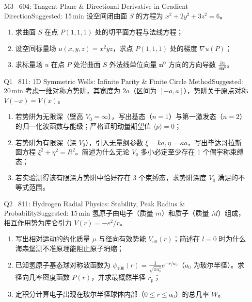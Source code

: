 \documentclass[a4paper,11pt]{article}
\begin{document}
\vspace{3pt}

\begin{problem}{M3 \textbar\ 604: Tangent Plane \& Directional Derivative in Gradient Direction}{Suggested: 15\,min}
设空间闭曲面 $S$ 的方程为 $x^2 + 2y^2 + 3z^2 = 6$。
\begin{enumerate}[leftmargin=1.5em,itemsep=1pt,topsep=1pt]
  \item 求曲面 $S$ 在点 $P(1, 1, 1)$ 处的切平面方程与法线方程；
  \item 设空间标量场 $u(x, y, z) = x^2 y z$，求点 $P(1, 1, 1)$ 处的梯度 $\nabla u(P)$；
  \item 求标量场 $u$ 在点 $P$ 处沿曲面 $S$ 外法线单位向量 $\mathbf{n}^0$ 方向的方向导数 $\frac{\partial u}{\partial \mathbf{n}^0}$。
\end{enumerate}
\end{problem}

\vspace{3pt}

\begin{problem}{Q1 \textbar\ 811: 1D Symmetric Wells: Infinite Parity \& Finite Circle Method}{Suggested: 20\,min}
考虑一维对称方势阱，其宽度为 $2a$（区间为 $[-a, a]$），势阱关于原点对称 $V(-x) = V(x)$。
\begin{enumerate}[leftmargin=1.5em,itemsep=1pt,topsep=1pt]
  \item 若势阱为无限深（壁高 $V_0 = \infty$），写出基态（$n=1$）与第一激发态（$n=2$）的归一化波函数与能级；严格证明动量期望值 $\langle p \rangle = 0$；
  \item 若势阱为有限深（深 $V_0$），引入无量纲参数 $\xi = ka, \eta = \kappa a$，写出毕达哥拉斯圆方程 $\xi^2 + \eta^2 = R^2$。简述为什么无论 $V_0$ 多小必定至少存在 1 个偶宇称束缚态；
  \item 若实验测得该有限深方势阱中恰好存在 3 个束缚态，求势阱深度 $V_0$ 满足的不等式范围。
\end{enumerate}
\end{problem}

\vspace{3pt}

\begin{problem}{Q2 \textbar\ 811: Hydrogen Radial Physics: Stability, Peak Radius \& Probability}{Suggested: 15\,min}
氢原子由电子（质量 $m$）和质子（质量 $M$）组成，相互作用势为库仑引力 $V(r) = -e^2/r$。
\begin{enumerate}[leftmargin=1.5em,itemsep=1pt,topsep=1pt]
  \item 写出相对运动的约化质量 $\mu$ 与径向有效势能 $V_{\text{eff}}(r)$；简述在 $l=0$ 时为什么海森堡测不准原理能阻止原子坍缩；
  \item 已知氢原子基态球对称波函数为 $\psi_{100}(r) = \frac{1}{\sqrt{\pi a_0^3}} e^{-r/a_0}$（$a_0$ 为玻尔半径）。求径向几率密度函数 $P(r)$，并求最概然半径 $r_p$；
  \item 定积分计算电子出现在玻尔半径球体内部（$0 \le r \le a_0$）的总几率 $W$。
\end{enumerate}
\end{problem}
\end{document}
